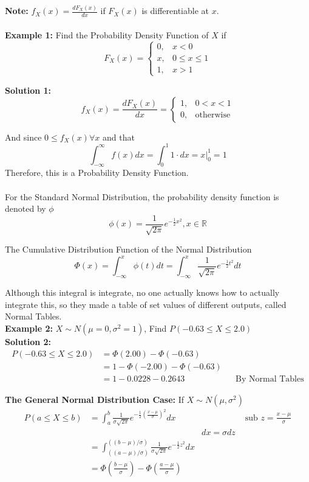 \documentclass[12pt]{article}
\begin{document}
\textbf{Note:} $f_X (x) = \frac{dF_X (x)}{dx}$ if $F_X (x)$ is differentiable at $x$.\\
\\
\textbf{Example 1:} Find the Probability Density Function of $X$ if $$F_X (x) = \begin{cases}
0, & x < 0\\
x, & 0 \leq x \leq 1\\
1, & x > 1
\end{cases}
$$

\textbf{Solution 1:} $$f_X (x) = \frac{dF_X (x)}{dx} = \begin{cases}
1, & 0 < x < 1\\
0, & \text{otherwise}
\end{cases}
$$

And since $0 \leq f_X (x) \forall x$ and that $$\int^\infty_{-\infty} f(x) dx = \int^1_{0} 1 \cdot dx = x\rvert^1_0 = 1$$
Therefore, this is a Probability Density Function.\\
\\
For the Standard Normal Distribution, the probability density function is denoted by $\phi$
$$\phi (x) = \frac{1}{\sqrt{2\pi}}e^{-\frac{1}{2}x^2}, x \in\mathbb{R}$$

The Cumulative Distribution Function of the Normal Distribution
$$\Phi (x) = \int^x_{-\infty} \phi (t) dt = \int^x_{-\infty} \frac{1}{\sqrt{2\pi}}e^{-\frac{1}{2}t^2} dt$$

Although this integral is integrate, no one actually knows how to actually integrate this, so they made a table of set values of different outputs, called Normal Tables.\\

\textbf{Example 2:} $X\sim N(\mu = 0,\sigma^2 = 1)$, Find $P(-0.63 \leq X \leq 2.0)$\\

\textbf{Solution 2:}
\begin{align*}
	P(-0.63 \leq X \leq 2.0) &= \Phi (2.00) - \Phi (-0.63)\\
	&= 1 - \Phi (-2.00) - \Phi (-0.63)\\
	&= 1 - 0.0228 - 0.2643 && \text{By Normal Tables}
\end{align*}

\textbf{The General Normal Distribution Case:} If $X\sim N(\mu,\sigma^2)$
\begin{align*}
	P(a \leq X \leq b) &= \int^b_a \frac{1}{\sigma\sqrt{2\pi}}e^{-\frac{1}{2}(\frac{x - \mu}{\sigma})^2} dx &&\text{ sub } z = \frac{x-\mu}{\sigma}\\
	&& dx = \sigma dz\\
	&= \int^{((b-\mu)/\sigma)}_{((a-\mu)/\sigma)} \frac{1}{\sigma\sqrt{2\pi}}e^{-\frac{1}{2}z^2} dx\\
	&= \Phi (\frac{b - \mu}{\sigma}) - \Phi (\frac{a - \mu}{\sigma})
\end{align*}
\end{document}

